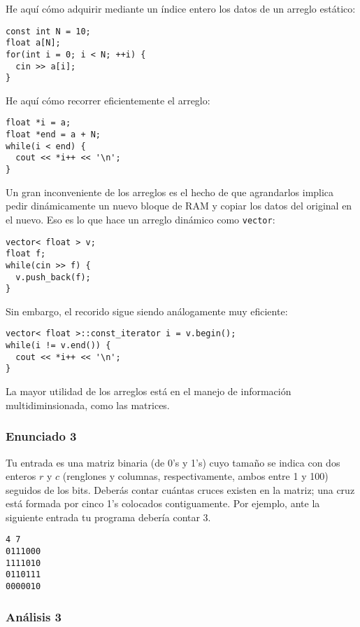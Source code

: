 \documentclass[10pt,letterpaper,twocolumn,spanish]{article}
\begin{document}
He aquí cómo adquirir mediante un índice entero los datos de un arreglo estático:

\begin{verbatim}
const int N = 10;
float a[N];
for(int i = 0; i < N; ++i) {
  cin >> a[i];
}
\end{verbatim}

He aquí cómo recorrer eficientemente el arreglo:

\begin{verbatim}
float *i = a;
float *end = a + N;
while(i < end) {
  cout << *i++ << '\n';
}
\end{verbatim}

Un gran inconveniente de los arreglos es el hecho de que agrandarlos implica pedir dinámicamente un nuevo bloque de RAM y copiar los datos del original en el nuevo. Eso es lo que hace un arreglo dinámico como \texttt{vector}:

\begin{verbatim}
vector< float > v;
float f;
while(cin >> f) {
  v.push_back(f);
}
\end{verbatim}

Sin embargo, el recorido sigue siendo análogamente muy eficiente:

\begin{verbatim}
vector< float >::const_iterator i = v.begin();
while(i != v.end()) {
  cout << *i++ << '\n';
}
\end{verbatim}

La mayor utilidad de los arreglos está en el manejo de información multidiminsionada, como las matrices.

\subsubsection*{Enunciado 3}

Tu entrada es una matriz binaria (de 0's y 1's) cuyo tamaño se indica con dos enteros $r$ y $c$ (renglones y columnas, respectivamente, ambos entre 1 y 100) seguidos de los bits. Deberás contar cuántas cruces existen en la matriz; una cruz está formada por cinco 1's colocados contiguamente. Por ejemplo, ante la siguiente entrada tu programa debería contar 3.
\begin{verbatim}
4 7
0111000
1111010
0110111
0000010
\end{verbatim}

\subsubsection*{Análisis 3}
\end{document}
